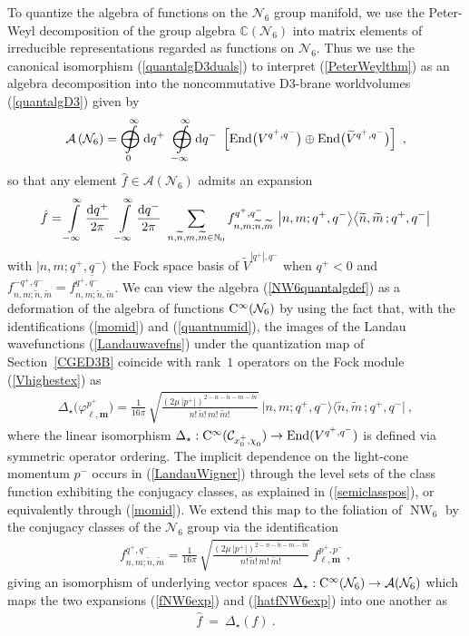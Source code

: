 \documentclass[11pt,a4paper]{article}
\DeclareMathOperator{\NW}{NW}
\newcommand{\mbf}[1]{{\boldsymbol {#1} }}
\def\dd{{\rm d}}
\def\mm{{\mbf m}}
\def\mell{{\mbf\ell}}
\newcommand{\complex}{{\mathbb C}} %
\newcommand{\nat}{{\mathbb N}} %
\newcommand{\beq}{\begin{eqnarray}}
\newcommand{\eeq}{\end{eqnarray}}
\begin{document}
To quantize the algebra of functions on the $\mathcal{N}_6$ group
manifold, we use the Peter-Weyl decomposition of the group algebra
$\complex(\mathcal{N}_6)$ into matrix elements of irreducible
representations regarded as functions on $\mathcal{N}_6$. Thus we use
the canonical isomorphism (\ref{quantalgD3duals}) to
interpret (\ref{PeterWeylthm}) as an algebra decomposition into
the noncommutative D3-brane worldvolumes (\ref{quantalgD3}) given by
\beq
\mathcal{A}\left(\mathcal{N}_6\right)=~{\int\limits_0^\infty
\!\!\!\!\!\!\!\!\!\!\!\!~\,\bigodot\!\!\!\!\!\!\!\!\!\!\mbf-\!\!
\mbf-}~\dd q^+~~{\int\limits_{-\infty}^\infty
\!\!\!\!\!\!\!\!\!\!\!\!~\bigodot\!\!\!\!\!\!\!\!\!\!\mbf-\!\!
\mbf-}~\dd q^-~\left[{\rm End}\bigl(V^{q^+,q^-}\bigr)\oplus
{\rm End}\bigl(\widetilde{V}^{q^+,q^-}\bigr)\right] \ ,
\label{NW6quantalgdef}\eeq
so that any element $\hat f\in\mathcal{A}(\mathcal{N}_6)$ admits an
expansion
\beq
\hat f=\int\limits_{-\infty}^\infty
\frac{\dd q^+}{2\pi}~\int\limits_{-\infty}^\infty\frac{\dd q^-}
{2\pi}~\sum_{n,\widetilde{n},m,\widetilde{m}\in\nat_0}
f_{n,m;\widetilde{n},\widetilde{m}}^{q^+,q^-}~
\bigl|n,m;q^+,q^-\bigr\rangle\bigl\langle
\widetilde{n},\widetilde{m}\,;q^+,q^-\bigr|
\label{hatfNW6exp}\eeq
with $|n,m;q^+,q^-\rangle$ the Fock space basis of
$\widetilde{V}^{|q^+|,q^-}$ when $q^+<0$ and
$f_{n,m;\widetilde{n},\widetilde{m}}^{-q^+,q^-}=
\overline{f_{n,m;\widetilde{n},\widetilde{m}}^{q^+,q^-}}$.
We can view the algebra
(\ref{NW6quantalgdef}) as a deformation of the algebra of functions
${\rm C}^\infty(\mathcal{N}_6)$ by using the fact that, with the
identifications (\ref{momid}) and (\ref{quantnumid}),
the images of the Landau wavefunctions (\ref{Landauwavefns}) under the
quantization map of Section~\ref{CGED3B} coincide with rank~$1$
operators on the Fock module (\ref{Vhighestex}) as~\cite{LSZ1}
\beq
\Delta_\star\bigl(\varphi^{p^+}_{\mell,\mm}\bigr)=
\frac1{16\pi}\,\sqrt{\mbox{$\frac{\left(2\mu\,\left|p^+\right|
\right)^{2-n-\widetilde{n}-m-\widetilde{m}}}{n!\,\widetilde{n}!\,m!\,
\widetilde{m}!}$}}~\bigl|n,m;q^+,q^-\bigr\rangle\bigl\langle
\widetilde{n},\widetilde{m}\,;q^+,q^-\bigr| \ ,
\label{LandauWigner}\eeq
where the linear isomorphism $\Delta_\star:{\rm
  C}^\infty(\mathcal{C}_{x_0^+,\chi_0^{~}})\to{\rm End}(V^{q^+,q^-})$
is defined via symmetric operator ordering. The implicit dependence on
the light-cone momentum $p^-$ occurs in (\ref{LandauWigner}) through
the level sets of the class function exhibiting the conjugacy classes,
as explained in (\ref{semiclasspos}), or equivalently through
(\ref{momid}). We extend this map to the foliation of $\NW_6$ by the
conjugacy classes of the $\mathcal{N}_6$ group via the identification
\beq
f_{n,m;\widetilde{n},\widetilde{m}}^{q^+,q^-}=
\frac1{16\pi}\,\sqrt{\mbox{$\frac{\left(2\mu\,\left|p^+\right|
\right)^{2-n-\widetilde{n}-m-\widetilde{m}}}{n!\,\widetilde{n}!\,m!\,
\widetilde{m}!}$}}~f_{\mell,\mm}^{p^+,p^-} \ ,
\label{fextid}\eeq
giving an isomorphism of underlying vector spaces
$\Delta_\star:{\rm
  C}^\infty(\mathcal{N}_6)\to\mathcal{A}(\mathcal{N}_6)$ which maps the
two expansions (\ref{fNW6exp}) and (\ref{hatfNW6exp}) into one another
as
\beq
\hat f~=~\Delta_\star(f) \ .
\label{DeltastarNW6}\eeq
\end{document}

